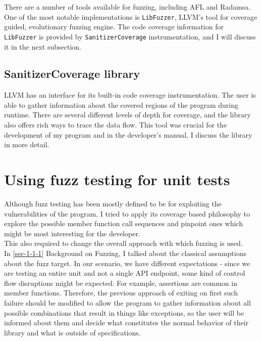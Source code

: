\documentclass{elteikthesis}[2018/06/06]
\newcommand*{\code}{\lstinline[keywordstyle=\color{violet}, basicstyle=\color{violet}]}
\begin{document}
There are a number of tools available for fuzzing, including AFL and Radamsa. One of the most notable implementations is \code{LibFuzzer}, LLVM's tool for coverage guided, evolutionary fuzzing engine\cite{libfuzzer docs}. The code coverage information for \code{LibFuzzer} is provided by \code{SanitizerCoverage} instrumentation, and I will discuss it in the next subsection. \\
\subsection{SanitizerCoverage library}
\label{sec-1-1-2}
LLVM has an interface for its built-in code coverage instrumentation\cite{sanitizer coverage docs}. The user is able to gather information about the covered regions of the program during runtime. There are several different levels of depth for coverage, and the library also offers rich ways to trace the data flow. This tool was crucial for the development of my program and in the developer's manual, I discuss the library in more detail. \\

\section{Using fuzz testing for unit tests}
\label{sec-1-2}
Although fuzz testing has been mostly defined to be for exploiting the vulnerabilities of the program, I tried to apply its coverage based philosophy to explore the possible member function call sequences and pinpoint ones which might be most interesting for the developer. \\
This also required to change the overall approach with which fuzzing is used. \\

In \ref{sec-1-1-1} Background on Fuzzing, I talked about the classical assumptions about the fuzz target. In our scenario, we have different expectations - since we are testing an entire unit and not a single API endpoint, some kind of control flow disruptions might be expected. For example, assertions are common in member functions. Therefore, the previous approach of exiting on first such failure should be modified to allow the program to gather information about all possible combinations that result in things like exceptions, so the user will be informed about them and decide what constitutes the normal behavior of their library and what is outside of specifications. \\
\end{document}
